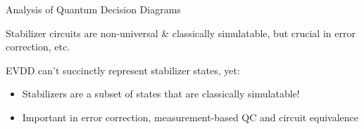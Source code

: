 








\begin{refframe}{Analysis of Quantum Decision Diagrams}

\centering
{}	

\alert{Stabilizer circuits are non-universal \& classically simulatable, but crucial in error correction, etc.}

\pause


\begin{alertblock}{EVDD can't succinctly represent stabilizer states, yet:}
	\begin{itemize}
		\item Stabilizers are a subset of states that are \alert{classically simulatable!}
		\item Important in error correction, measurement-based QC and circuit equivalence
	\end{itemize}
\end{alertblock}



\end{refframe}
